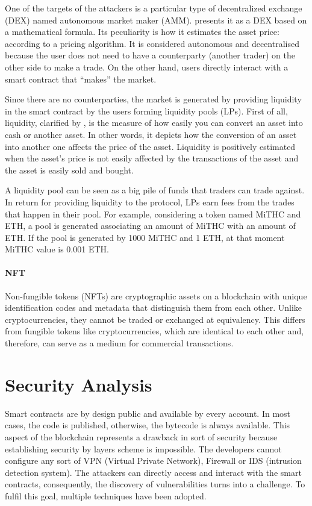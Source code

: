 One of the targets of the attackers is a particular type of decentralized exchange (DEX) named autonomous market maker (AMM). 
\citet{AMMDef} presents it as a DEX based on a mathematical formula. Its peculiarity is how it estimates the asset price: according to a pricing algorithm.
It is considered autonomous and decentralised because the user does not need to have a counterparty (another trader) on the other side to make a trade. 
On the other hand, users directly interact with a smart contract that “makes” the market.

Since there are no counterparties, the market is generated by providing liquidity in the smart contract by the users forming liquidity pools (LPs).
First of all, liquidity, clarified by \citet{LiquidityDef}, is the measure of how easily you can convert an asset into cash or another asset. 
In other words, it depicts how the conversion of an asset into another one affects the price of the asset.
Liquidity is positively estimated when the asset's price is not easily affected by the transactions of the asset and the asset is easily sold and bought. 

A liquidity pool can be seen as a big pile of funds that traders can trade against. 
In return for providing liquidity to the protocol, LPs earn fees from the trades that happen in their pool.
For example, considering a token named MiTHC and ETH, a pool is generated associating an amount of MiTHC with an amount of ETH. 
If the pool is generated by 1000 MiTHC and 1 ETH, at that moment MiTHC value is 0.001 ETH.

\paragraph{NFT} Non-fungible tokens (NFTs) are cryptographic assets on a blockchain with unique identification codes and metadata that distinguish them from each other.
Unlike cryptocurrencies, they cannot be traded or exchanged at equivalency. 
This differs from fungible tokens like cryptocurrencies, which are identical to each other and, therefore, can serve as a medium for commercial transactions. 



\section{Security Analysis}
\label{sec:Backgroud:SecurityAnalysis}

Smart contracts are by design public and available by every account. 
In most cases, the code is published, otherwise, the bytecode is always available.
This aspect of the blockchain represents a drawback in sort of security because establishing security by layers scheme is impossible.
The developers cannot configure any sort of VPN (Virtual Private Network), Firewall or IDS (intrusion detection system). 
The attackers can directly access and interact with the smart contracts, consequently, the discovery of vulnerabilities turns into a challenge.
To fulfil this goal, multiple techniques have been adopted.


